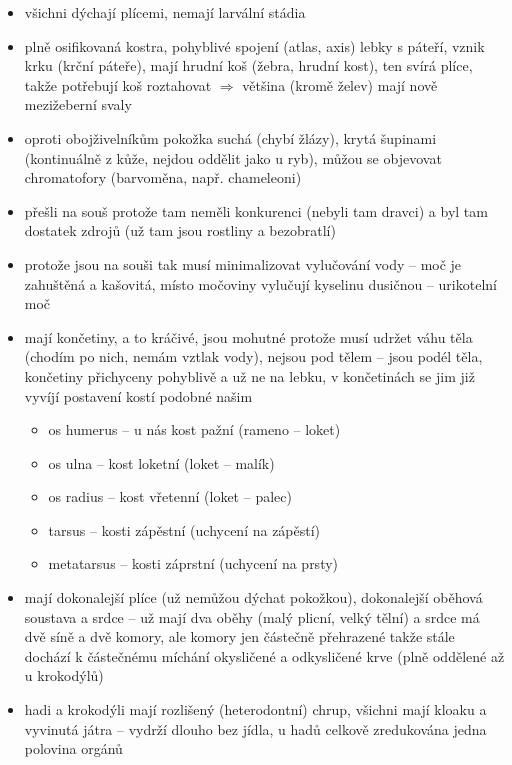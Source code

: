\documentclass{article}
\begin{document}
\begin{itemize}
\begin{minipage}{0.2\textwidth}
  \end{minipage}
  \item všichni dýchají plícemi, nemají larvální stádia
  \item plně osifikovaná kostra, pohyblivé spojení (atlas, axis) lebky s páteří, vznik krku (krční páteře), mají hrudní koš (žebra, hrudní kost), ten svírá plíce, takže potřebují koš roztahovat $\Rightarrow$ většina (kromě želev) mají nově mezižeberní svaly
  \item oproti obojživelníkům pokožka suchá (chybí žlázy), krytá šupinami (kontinuálně z kůže, nejdou oddělit jako u ryb), můžou se objevovat chromatofory (barvoměna, např. chameleoni)
  \item přešli na souš protože tam neměli konkurenci (nebyli tam dravci) a byl tam dostatek zdrojů (už tam jsou rostliny a bezobratlí)
  \item protože jsou na souši tak musí minimalizovat vylučování vody -- moč je zahuštěná a kašovitá, místo močoviny vylučují kyselinu dusičnou -- urikotelní moč
  \item mají končetiny, a to kráčivé, jsou mohutné protože musí udržet váhu těla (chodím po nich, nemám vztlak vody), nejsou pod tělem -- jsou podél těla, končetiny přichyceny pohyblivě a už ne na lebku, v končetinách se jim již vyvíjí postavení kostí podobné našim
  \begin{itemize}
    \item os humerus -- u nás kost pažní (rameno -- loket)
    \item os ulna -- kost loketní (loket -- malík)
    \item os radius -- kost vřetenní (loket -- palec)
    \item tarsus -- kosti zápěstní (uchycení na zápěstí)
    \item metatarsus -- kosti záprstní (uchycení na prsty)
  \end{itemize}
  \item mají dokonalejší plíce (už nemůžou dýchat pokožkou), dokonalejší oběhová soustava a srdce -- už mají dva oběhy (malý plicní, velký tělní) a srdce má dvě síně a dvě komory, ale komory jen částečně přehrazené takže stále dochází k částečnému míchání okysličené a odkysličené krve (plně oddělené až u krokodýlů)
  \item hadi a krokodýli mají rozlišený (heterodontní) chrup, všichni mají kloaku a vyvinutá játra -- vydrží dlouho bez jídla, u hadů celkově zredukována jedna polovina orgánů
\end{itemize}
\end{document}

